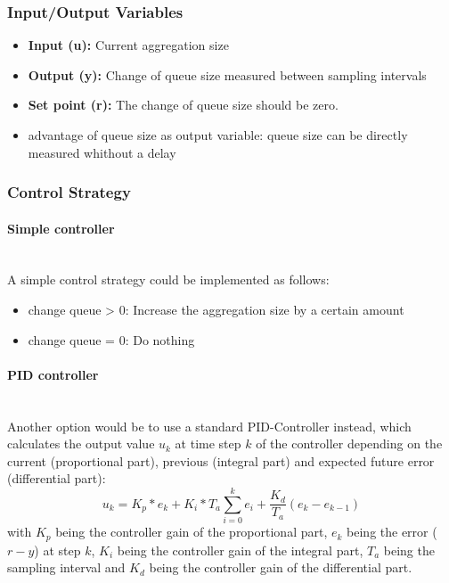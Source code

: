 \subsubsection{Input/Output Variables}

\begin{itemize}
	\item \textbf{Input (u):} Current aggregation size
	\item \textbf{Output (y):} Change of queue size measured between sampling intervals
	\item \textbf{Set point (r):} The change of queue size should be zero.
	\item advantage of queue size as output variable: queue size can be directly measured whithout a delay
\end{itemize}

\subsubsection{Control Strategy}

\paragraph{Simple controller}\mbox{}\\
A simple control strategy could be implemented as follows:
\begin{itemize}
	\item change queue > 0: Increase the aggregation size by a certain amount
	\item change queue = 0: Do nothing
\end{itemize}

\paragraph{PID controller}\mbox{}\\
Another option would be to use a standard PID-Controller instead, which calculates the output value $u_k$ at time step $k$ of the controller depending on the current (proportional part), previous (integral part) and expected future error (differential part):
\begin{displaymath}
	u_k=K_p*e_k+K_i*T_a\sum_{i=0}^k e_i+\frac{K_d}{T_a}(e_k-e_{k-1})
\end{displaymath}
with $K_p$ being the controller gain of the proportional part, $e_k$ being the error ($r-y$) at step $k$, $K_i$ being the controller gain of the integral part, $T_a$ being the sampling interval and $K_d$ being the controller gain of the differential part.

